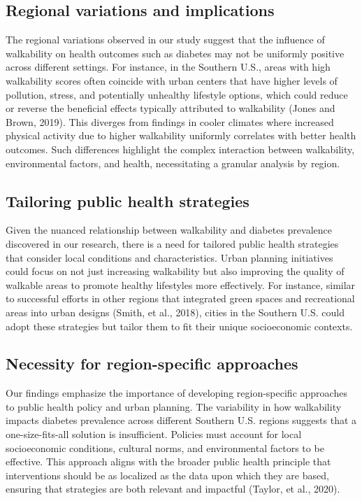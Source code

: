 \documentclass[
]{article}
\begin{document}
\subsection{Regional variations and
implications}\label{regional-variations-and-implications}

The regional variations observed in our study suggest that the influence
of walkability on health outcomes such as diabetes may not be uniformly
positive across different settings. For instance, in the Southern U.S.,
areas with high walkability scores often coincide with urban centers
that have higher levels of pollution, stress, and potentially unhealthy
lifestyle options, which could reduce or reverse the beneficial effects
typically attributed to walkability (Jones and Brown, 2019). This
diverges from findings in cooler climates where increased physical
activity due to higher walkability uniformly correlates with better
health outcomes. Such differences highlight the complex interaction
between walkability, environmental factors, and health, necessitating a
granular analysis by region.

\subsection{Tailoring public health
strategies}\label{tailoring-public-health-strategies}

Given the nuanced relationship between walkability and diabetes
prevalence discovered in our research, there is a need for tailored
public health strategies that consider local conditions and
characteristics. Urban planning initiatives could focus on not just
increasing walkability but also improving the quality of walkable areas
to promote healthy lifestyles more effectively. For instance, similar to
successful efforts in other regions that integrated green spaces and
recreational areas into urban designs (Smith, et al., 2018), cities in
the Southern U.S. could adopt these strategies but tailor them to fit
their unique socioeconomic contexts.

\subsection{Necessity for region-specific
approaches}\label{necessity-for-region-specific-approaches}

Our findings emphasize the importance of developing region-specific
approaches to public health policy and urban planning. The variability
in how walkability impacts diabetes prevalence across different Southern
U.S. regions suggests that a one-size-fits-all solution is insufficient.
Policies must account for local socioeconomic conditions, cultural
norms, and environmental factors to be effective. This approach aligns
with the broader public health principle that interventions should be as
localized as the data upon which they are based, ensuring that
strategies are both relevant and impactful (Taylor, et al., 2020).
\end{document}
